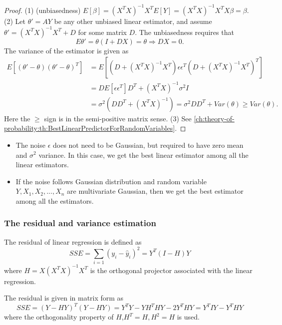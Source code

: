 \begin{refsection}
\begin{proof}
	(1) (unbiasedness) $E[\beta] = (X^TX)^{-1}X^T E[Y] = (X^TX)^{-1}X^TX\beta = \beta.$
	(2) Let $\theta' = AY $ be any other unbiased linear estimator, and assume $\theta' = (X^TX)^{-1}X^T + D $ for some matrix $D$. The unbiasedness requires that $$E\theta' = \theta(I + DX) = \theta \Rightarrow DX = 0.$$
	The variance of the estimator is given as
	\begin{align*}
	E[(\theta' - \theta)(\theta' - \theta)^T] &= E[(D + (X^TX)^{-1}X^T)\epsilon\epsilon^T(D+(X^TX)^{-1}X^T)^T]\\
	&=DE[\epsilon\epsilon^T]D^T + (X^TX)^{-1} \sigma^2 I \\
	&=\sigma^2 (DD^T + (X^TX)^{-1}) = \sigma^2 DD^T + Var(\theta) \geq Var(\theta).
	\end{align*} 
	Here the $\geq$ sign is in the semi-positive matrix sense.  
	(3) See \autoref{ch:theory-of-probability:th:BestLinearPredictorForRandomVariables}.
\end{proof}

\begin{remark}\hfill
\begin{itemize}
	\item The noise $\epsilon$ does not need to be Gaussian, but required to have zero mean and $\sigma^2$ variance. In this case, we get the best linear estimator among all the linear estimators.
	\item If the noise follows Gaussian distribution and random variable $Y,X_1,X_2,...,X_n$ are multivariate Gaussian, then we get the best estimator among all the estimators.
\end{itemize}	
	
\end{remark}




\subsubsection{The residual and variance estimation}
\begin{definition}
	The residual of linear regression is defined as
	$$SSE = \sum_{i=1} (y_i - \hat{y}_i)^2 = Y^T(I-H)Y$$
	where $H=X(X^TX)^{-1}X^T$ is the orthogonal projector associated with the linear regression.
\end{definition}

\begin{remark}[derivation]
	The residual is given in matrix form as $$SSE = (Y - HY)^T(Y-HY) = Y^TY - YH^THY - 2Y^THY = Y^TIY - Y^THY$$
	where the orthogonality property of $H$,$H^T = H,H^2 = H$ is used. 
\end{remark}



\end{refsection}
